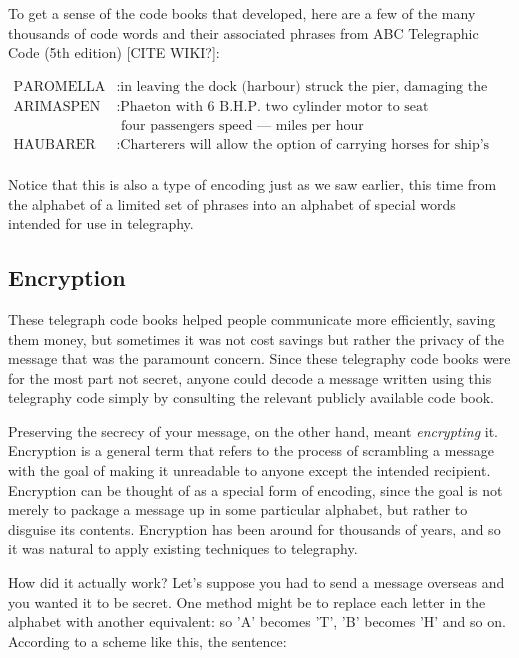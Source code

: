 \documentclass[UTF8]{book}
\begin{document}
\begin{CJK}{UTF8}{gbsn}
To get a sense of the code books that developed, here are a few of the many thousands of code words and their associated phrases from ABC Telegraphic Code (5th edition) [CITE WIKI?]:

\begin{align*}
	\text{PAROMELLA} &: \text{in leaving the dock (harbour) struck the pier, damaging the stern} \\
	\text{ARIMASPEN } &: \text{Phaeton with 6 B.H.P. two cylinder motor to seat} \\
         & \text{   four passengers speed — miles per hour} \\
	\text{HAUBARER  } &: \text{Charterers will allow the option of carrying horses for ship's benefit} \\
\end{align*}

Notice that this is also a type of encoding just as we saw earlier, this time from the alphabet of a limited set of phrases into an alphabet of special words intended for use in telegraphy.

\subsection{Encryption}

These telegraph code books helped people communicate more efficiently, saving them money, but sometimes it was not cost savings but rather the privacy of the message that was the paramount concern. Since these telegraphy code books were for the most part not secret, anyone could decode a message written using this telegraphy code simply by consulting the relevant publicly available code book.

Preserving the secrecy of your message, on the other hand, meant \emph{encrypting} it. Encryption is a general term that refers to the process of scrambling a message with the goal of making it unreadable to anyone except the intended recipient. Encryption can be thought of as a special form of encoding, since the goal is not merely to package a message up in some particular alphabet, but rather to disguise its contents. Encryption has been around for thousands of years, and so it was natural to apply existing techniques to telegraphy.

How did it actually work? Let's suppose you had to send a message overseas and you wanted it to be secret. One method might be to replace each letter in the alphabet with another equivalent: so 'A' becomes 'T', 'B' becomes 'H' and so on. According to a scheme like this, the sentence:


\end{CJK}
\end{document}

